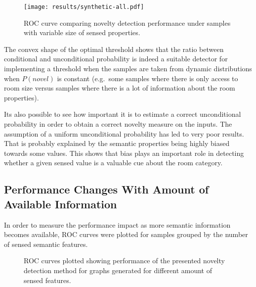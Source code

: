 \documentclass[runningheads,a4paper]{llncs}
\begin{document}
\begin{figure}[h]
\centering
\texttt{[image: results/synthetic-all.pdf]}

\caption{\label{fig:synthetic-roc}ROC curve comparing novelty detection performance
         under samples with variable size of sensed properties.}
\end{figure}


The convex shape of the optimal threshold shows that the ratio between conditional
and unconditional probability is indeed a suitable detector for implementing a threshold when
the samples are taken from dynamic distributions when $P(novel)$ is constant
(e.g.\ some samples where there is only access to room size versus
samples where there is a lot of information about the room properties).

Its also possible to see how important it is to estimate a correct unconditional
probability in order to obtain a correct novelty measure on the inputs.
The assumption of a uniform unconditional probability has led to very poor results.
That is probably explained by the semantic properties being highly
biased towards some values. This shows that bias plays an important role
in detecting whether a given sensed value is a valuable cue about the room category.



\subsection{Performance Changes With Amount of Available Information}
In order to measure the performance impact as more semantic information becomes
available, ROC curves were plotted for samples grouped by the number of sensed
semantic features.

\begin{figure}[h]
\centering

\qquad
{}

\qquad
{}

\caption{\label{fig:synthetic-roc-breakdown}ROC curves plotted showing performance of the
         presented novelty detection method for graphs generated for different amount of
         sensed features.}
\end{figure}
\end{document}

